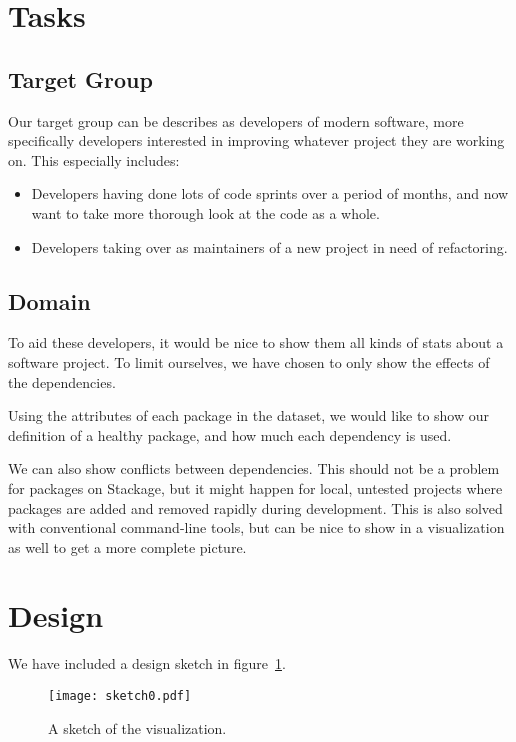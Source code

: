 \documentclass[a4paper,12pt]{article}
\begin{document}
\section{Tasks}

\subsection{Target Group}

Our target group can be describes as developers of modern software, more
specifically developers interested in improving whatever project they are
working on.  This especially includes:

\begin{itemize}
\item Developers having done lots of code sprints over a period of months, and
now want to take more thorough look at the code as a whole.
\item Developers taking over as maintainers of a new project in need of
refactoring.
\end{itemize}


\subsection{Domain}

To aid these developers, it would be nice to show them all kinds of stats about
a software project.  To limit ourselves, we have chosen to only show the effects
of the dependencies.

Using the attributes of each package in the dataset, we would like to show our
definition of a healthy package, and how much each dependency is used.

We can also show conflicts between dependencies.  This should not be a problem
for packages on Stackage, but it might happen for local, untested projects where
packages are added and removed rapidly during development.  This is also solved
with conventional command-line tools, but can be nice to show in a visualization
as well to get a more complete picture.


\section{Design}

We have included a design sketch in figure~\ref{fig:sketch0}.

\begin{figure}[h!]
\begin{center}
\texttt{[image: sketch0.pdf]}
\caption{A sketch of the visualization.}
\label{fig:sketch0}
\end{center}
\end{figure}
\end{document}

